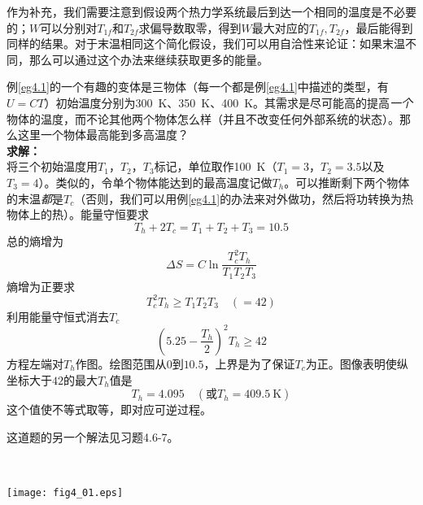 作为补充，我们需要注意到假设两个热力学系统最后到达一个相同的温度是不必要的；$W$可以分别对$T_{1f}$和$T_{2f}$求偏导数取零，得到$W$最大对应的$T_{1f}, T_{2f}$，最后能得到同样的结果。对于末温相同这个简化假设，我们可以用自洽性来论证：如果末温不同，那么可以通过这个办法来继续获取更多的能量。

\begin{example}\label{eg4.2}
例\ref{eg4.1}的一个有趣的变体是三物体（每一个都是例\ref{eg4.1}中描述的类型，有$U=CT$）初始温度分别为\SI{300}{\kelvin}、\SI{350}{\kelvin}、\SI{400}{\kelvin}。其需求是尽可能高的提高{\it 一个}物体的温度，而不论其他两个物体怎么样（并且不改变任何外部系统的状态）。那么这里一个物体最高能到多高温度？\\
{\bf 求解：}\\
将三个初始温度用$T_1$，$T_2$，$T_3$标记，单位取作\SI{100}{\kelvin}（$T_1=3$，$T_2=3.5$以及$T_3=4$）。类似的，令单个物体能达到的最高温度记做$T_h$。可以推断剩下两个物体的末温{\it 都}是$T_c$（否则，我们可以用例\ref{eg4.1}的办法来对外做功，然后将功转换为热物体上的热）。能量守恒要求
\[
T_h + 2T_c = T_1 + T_2 + T_3 = 10.5
\]
总的熵增为
\[
\Delta S = C\ln\frac{T_c^2T_h}{T_1T_2T_3}
\]
熵增为正要求
\[
T_c^2T_h \ge T_1T_2T_3 \quad (=42)
\]
利用能量守恒式消去$T_c$
\[
(5.25-\frac{T_h}{2})^2T_h\ge 42
\]
方程左端对$T_h$作图。绘图范围从$0$到$10.5$，上界是为了保证$T_c$为正。图像表明使纵坐标大于$42$的最大$T_h$值是
\[
T_h = 4.095 \quad(\text{或}T_h = \SI{409.5}{\kelvin})
\]
这个值使不等式取等，即对应可逆过程。
\end{example}

这道题的另一个解法见习题4.6-7。

\ 

{
	\centering
	\texttt{[image: fig4\_01.eps]} 
}

